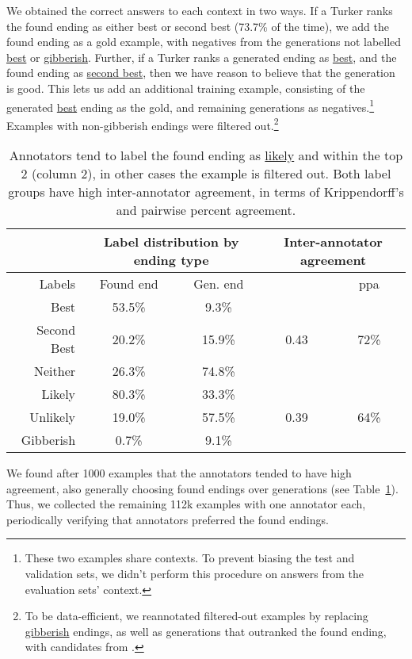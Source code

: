 \documentclass[11pt,a4paper]{article}
\begin{document}
We obtained the correct answers to each context in two ways. If a Turker ranks the found ending as either best or second best (73.7\% of the time), we add the found ending as a gold example, with negatives from the generations not labelled \underline{best} or \underline{gibberish}. Further, if a Turker ranks a generated ending as \underline{best}, and the found ending as \underline{second best}, then we have reason to believe that the generation is good. This lets us add an additional training example, consisting of the generated \underline{best} ending as the gold, and remaining generations as negatives.\footnote{These two examples share contexts. To prevent biasing the test and validation sets, we didn't perform this procedure on answers from the evaluation sets' context.} Examples with  non-gibberish endings were filtered out.\footnote{To be data-efficient, we reannotated filtered-out examples by replacing \underline{gibberish} endings, as well as generations that outranked the found ending, with candidates from .}


\begin{table}[t!]
\centering\small
\begin{tabular}{@{}r | c c |c c @{}}
& \multicolumn{2}{c|}{\parbox{2.8cm}{Label distribution by ending type}} & \multicolumn{2}{c}{\parbox{2cm}{Inter-annotator agreement}} \rule{0pt}{2ex} \\ \hline \rule{0pt}{2ex}
Labels & Found end & Gen. end &  & ppa\\ \hline \rule{0pt}{2ex}
Best & 53.5\% & 9.3\% & \multirow{3}{*}{0.43} & \multirow{3}{*}{72\%}\\
Second Best & 20.2\% & 15.9\% &\\
Neither & 26.3\% & 74.8\%& \\ \hline \rule{0pt}{2ex}
Likely & 80.3\% & 33.3\% & \multirow{3}{*}{0.39} & \multirow{3}{*}{64\%}\\
Unlikely & 19.0\% & 57.5\% \\
Gibberish & 0.7\% & 9.1\% \\ \hline
\end{tabular}
\vspace{-2mm}
\caption{Annotators tend to label the found ending as \underline{likely} and within the top 2 (column 2), in other cases the example is filtered out. Both label groups have high inter-annotator agreement, in terms of Krippendorff's  and pairwise percent agreement.
}
\label{tab:datastats3}
\end{table}
We found after 1000 examples that the annotators tended to have high agreement, also generally choosing found endings over generations (see Table~\ref{tab:datastats3}). Thus, we collected the remaining 112k examples with one annotator each, periodically verifying that annotators preferred the found endings.
 
\end{document}
